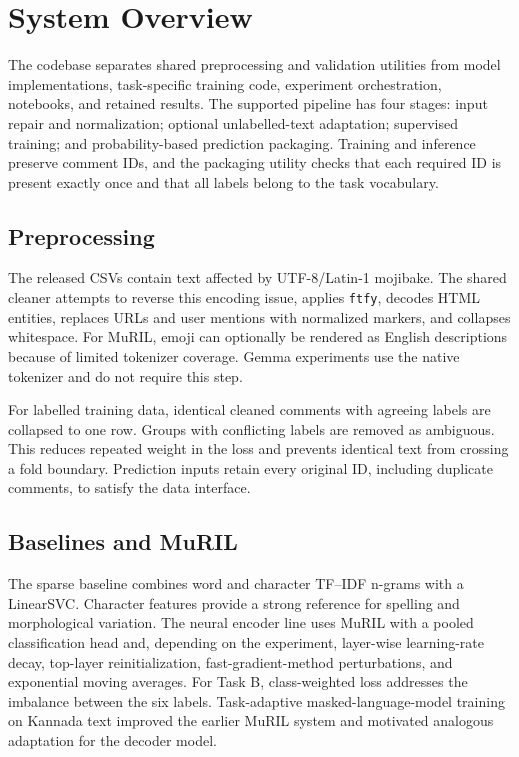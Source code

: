 \documentclass[10pt]{article}
\newcommand{\taskb}{Task B}
\begin{document}
\section{System Overview}
The codebase separates shared preprocessing and validation utilities from model
implementations, task-specific training code, experiment orchestration,
notebooks, and retained results. The supported pipeline has four stages:
input repair and normalization; optional unlabelled-text adaptation; supervised
training; and probability-based prediction packaging. Training and inference
preserve comment IDs, and the packaging utility checks that each required ID is
present exactly once and that all labels belong to the task vocabulary.

\subsection{Preprocessing}
The released CSVs contain text affected by UTF-8/Latin-1 mojibake. The shared
cleaner attempts to reverse this encoding issue, applies \texttt{ftfy}, decodes
HTML entities, replaces URLs and user mentions with normalized markers, and
collapses whitespace. For MuRIL, emoji can optionally be rendered as English
descriptions because of limited tokenizer coverage. Gemma experiments use the
native tokenizer and do not require this step.

For labelled training data, identical cleaned comments with agreeing labels are
collapsed to one row. Groups with conflicting labels are removed as ambiguous.
This reduces repeated weight in the loss and prevents identical text from
crossing a fold boundary. Prediction inputs retain every original ID, including
duplicate comments, to satisfy the data interface.

\subsection{Baselines and MuRIL}
The sparse baseline combines word and character TF--IDF n-grams with a
LinearSVC. Character features provide a strong reference for spelling and
morphological variation. The neural encoder line uses MuRIL with a pooled
classification head and, depending on the experiment, layer-wise learning-rate
decay, top-layer reinitialization, fast-gradient-method perturbations, and
exponential moving averages. For \taskb{}, class-weighted loss addresses the
imbalance between the six labels. Task-adaptive masked-language-model training
on Kannada text improved the earlier MuRIL system and motivated analogous
adaptation for the decoder model.
\end{document}

